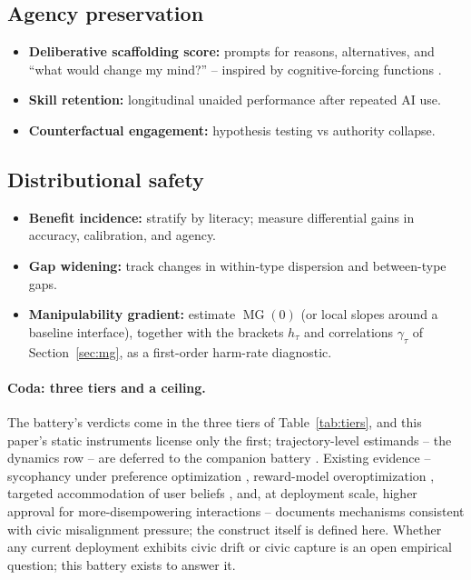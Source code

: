 \documentclass[11pt]{article}
\theoremstyle{definition}
\theoremstyle{remark}
\numberwithin{equation}{section}
\DeclareMathOperator{\MG}{MG}
\begin{document}
\subsection{Agency preservation}
\begin{itemize}
  \item \textbf{Deliberative scaffolding score:} prompts for reasons, alternatives, and ``what would change my mind?'' -- inspired by cognitive-forcing functions \citep{bucinca2021trust}.
  \item \textbf{Skill retention:} longitudinal unaided performance after repeated AI use.
  \item \textbf{Counterfactual engagement:} hypothesis testing vs authority collapse.
\end{itemize}

\subsection{Distributional safety}
\begin{itemize}
  \item \textbf{Benefit incidence:} stratify by literacy; measure differential gains in accuracy, calibration, and agency.
  \item \textbf{Gap widening:} track changes in within-type dispersion and between-type gaps.
  \item \textbf{Manipulability gradient:} estimate $\MG(0)$ (or local slopes around a baseline interface), together with the brackets $h_\tau$ and correlations $\gamma_\tau$ of Section~\ref{sec:mg}, as a first-order harm-rate diagnostic.
\end{itemize}

\paragraph{Coda: three tiers and a ceiling.} The battery's verdicts come in the three tiers of Table~\ref{tab:tiers}, and this paper's static instruments license only the first; trajectory-level estimands -- the dynamics row -- are deferred to the companion battery \citep{hofheinz2026drift}. Existing evidence -- sycophancy under preference optimization \citep{sharma2024towards}, reward-model overoptimization \citep{gao2023scaling}, targeted accommodation of user beliefs \citep{williams2025targeted}, and, at deployment scale, higher approval for more-disempowering interactions \citep{sharma2026whos} -- documents mechanisms consistent with civic misalignment pressure; the construct itself is defined here. Whether any current deployment exhibits civic drift or civic capture is an open empirical question; this battery exists to answer it.
\end{document}
